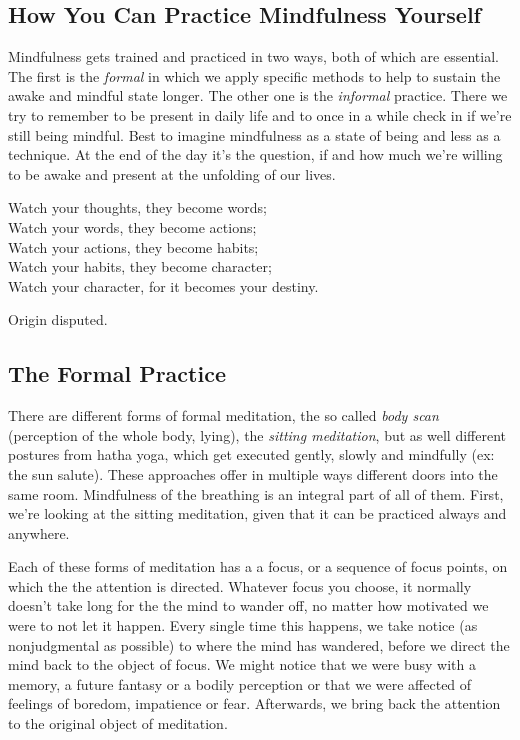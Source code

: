 \documentclass[../Book.Stress_regulation.tex]{subfiles}
\begin{document}
\subsection{How You Can Practice Mindfulness Yourself}
Mindfulness gets trained and practiced in two ways, both of which are essential. The first is the \emph{formal} in which we apply specific methods to help to sustain the awake and mindful state longer. The other one is the \emph{informal} practice. There we try to remember to be present in daily life and to once in a while check in if we're still being mindful. Best to imagine mindfulness as a state of being and less as a technique. At the end of the day it's the question, if and how much we're willing to be awake and present at the unfolding of our lives.

\setlength{}
\epigraph{Watch your thoughts, they become words;\\
Watch your words, they become actions;\\
Watch your actions, they become habits;\\
Watch your habits, they become character;\\
Watch your character, for it becomes your destiny.}{Origin disputed.}
\setlength{}

\subsection{The Formal Practice}

 There are different forms of formal meditation, the so called \emph{body scan} (perception of the whole body, lying), the \emph{sitting meditation}, but as well different postures from hatha yoga, which get executed gently, slowly and mindfully (ex: the sun salute).
These approaches offer in multiple ways different doors into the same room.
Mindfulness of the breathing is an integral part of all of them.
First, we're looking at the sitting meditation, given that it can be practiced always and anywhere.

Each of these forms of meditation has a a focus, or a sequence of focus points, on which the the attention is directed.
Whatever focus you choose, it normally doesn't take long for the the {mind to wander off}, no matter how motivated we were to not let it happen.
Every single time this happens, we {take notice} (as nonjudgmental as possible) to where the mind has wandered, before we direct the mind {back to the object of focus}.
We might notice that we were busy with a memory, a future fantasy or a bodily perception or that we were affected of feelings of boredom, impatience or fear. Afterwards, we bring back the attention to the original object of meditation.
\end{document}
